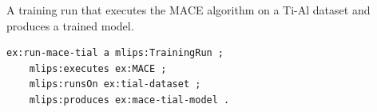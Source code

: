 A training run that executes the MACE algorithm on a Ti-Al dataset and produces a trained model.
\begin{lstlisting}[language=turtle]
ex:run-mace-tial a mlips:TrainingRun ;
    mlips:executes ex:MACE ;
    mlips:runsOn ex:tial-dataset ;
    mlips:produces ex:mace-tial-model .
\end{lstlisting}
